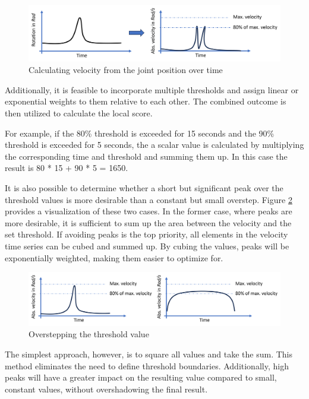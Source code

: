 \begin{figure}[H]
	\centerline{\includegraphics[width=1\textwidth]{figures/veloy.png}}
	\caption{Calculating velocity from the joint position over time}
	\label{velo}
\end{figure}

Additionally, it is feasible to incorporate multiple thresholds and assign linear or exponential weights to them relative to each other. The combined outcome is then utilized to calculate the local score.


For example, if the 80\% threshold is exceeded for 15 seconds and the 90\% threshold is exceeded for 5 seconds, the a scalar value is calculated by multiplying the corresponding time and threshold and summing them up. In this case the result is 80 * 15 + 90 * 5 = 1650.

It is also possible to determine whether a short but significant peak over the threshold values is more desirable than a constant but small overstep. Figure \ref{peaklong} provides a visualization of these two cases. In the former case, where peaks are more desirable, it is sufficient to sum up the area between the velocity and the set threshold. If avoiding peaks is the top priority, all elements in the velocity time series can be cubed and summed up. By cubing the values, peaks will be exponentially weighted, making them easier to optimize for.

\begin{figure}[H]
	\centerline{\includegraphics[width=1\textwidth]{figures/peaklong.png}}
	\caption{Overstepping the threshold value}
	\label{peaklong}
\end{figure}


The simplest approach, however, is to square all values and take the sum. This method eliminates the need to define threshold boundaries. Additionally, high peaks will have a greater impact on the resulting value compared to small, constant values, without overshadowing the final result.

